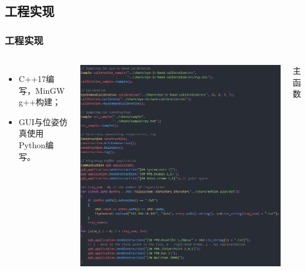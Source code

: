 \documentclass{beamer}
\begin{document}

\subsection{工程实现}

\begin{frame}
    \frametitle{工程实现}
    \centering
    \begin{columns}[onlytextwidth,T]
        \column{\dimexpr\linewidth-40mm-5mm}
        \centering
        \begin{itemize}
            \item C++17编写，MinGW g++构建；
            \item GUI与位姿仿真使用Python编写。
        \end{itemize}
        \vspace*{1cm}
        \includegraphics[scale=0.11]{主函数.png}\\
        \begin{center}
            主函数
        \end{center}
        \column{45mm}
        \centering

\end{columns}
\end{frame}
\end{document}
